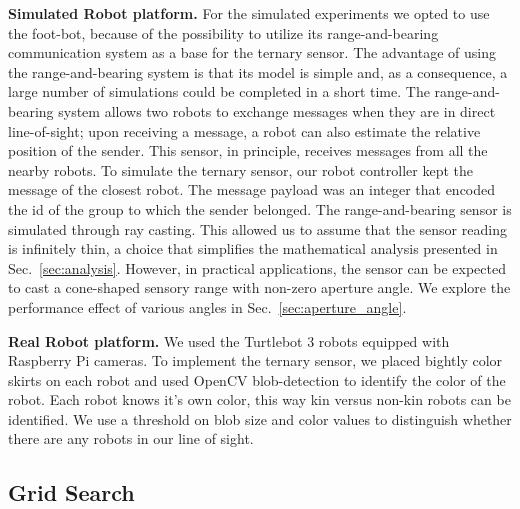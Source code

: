 \documentclass[letterpaper, 10 pt, conference]{ieeeconf}
\newcommand{\myparagraph}[1]{\textbf{#1.}}
\begin{document}
  \myparagraph{Simulated Robot platform}
  For the simulated experiments we opted to use the foot-bot, because of the
  possibility to utilize its range-and-bearing communication system as a base for
  the ternary sensor. The advantage of using the range-and-bearing system is that
  its model is simple and, as a consequence, a large number of simulations could
  be completed in a short time. The range-and-bearing system allows two robots to
  exchange messages when they are in direct line-of-sight; upon receiving a
  message, a robot can also estimate the relative position of the sender. This
  sensor, in principle, receives messages from all the nearby robots. To simulate
  the ternary sensor, our robot controller kept the message of the closest
  robot. The message payload was an integer that encoded the id of the group to
  which the sender belonged. The range-and-bearing sensor is simulated through ray
  casting. This allowed us to assume that the sensor reading is infinitely thin, a
  choice that simplifies the mathematical analysis presented in
  Sec.~\ref{sec:analysis}. However, in practical applications, the sensor can be
  expected to cast a cone-shaped sensory range with non-zero aperture angle. We
  explore the performance effect of various angles in
  Sec.~\ref{sec:aperture_angle}.

  \myparagraph{Real Robot platform}
  We used the Turtlebot 3 robots equipped with Raspberry Pi cameras.
  To implement the ternary sensor, we placed bightly color skirts on each robot
  and used OpenCV blob-detection to identify the color of the robot. Each robot
  knows it's own color, this way kin versus non-kin robots can be identified.
  We use a threshold on blob size and color values to distinguish whether there
  are any robots in our line of sight.

  \subsection{Grid Search}
  \label{sec:gridsearch}
\end{document}
